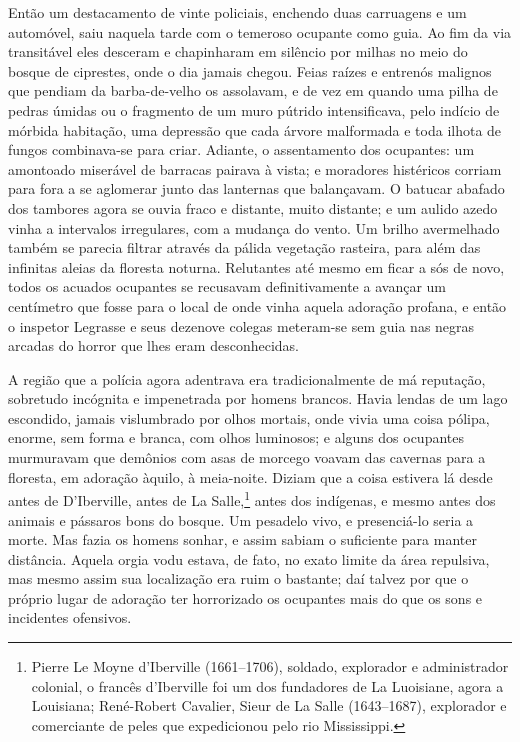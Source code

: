 Então um destacamento de vinte policiais, enchendo duas carruagens e um
automóvel, saiu naquela tarde com o temeroso ocupante como guia. Ao fim
da via transitável eles desceram e chapinharam em silêncio por milhas
no meio do bosque de ciprestes, onde o dia jamais chegou. Feias raízes e
entrenós malignos que pendiam da barba-de-velho os assolavam, e de vez
em quando uma pilha de pedras úmidas ou o fragmento de um muro pútrido
intensificava, pelo indício de mórbida habitação, uma depressão que cada
árvore malformada e toda ilhota de fungos combinava-se para criar.
Adiante, o assentamento dos ocupantes: um amontoado miserável de
barracas pairava à vista; e moradores histéricos corriam para fora a se
aglomerar junto das lanternas que balançavam. O batucar abafado dos
tambores agora se ouvia fraco e distante, muito distante; e um aulido
azedo vinha a intervalos irregulares, com a mudança do vento. Um brilho
avermelhado também se parecia filtrar através da pálida vegetação
rasteira, para além das infinitas aleias da floresta noturna. Relutantes
até mesmo em ficar a sós de novo, todos os acuados ocupantes se
recusavam definitivamente a avançar um centímetro que fosse para o local de onde
vinha aquela adoração profana, e então o inspetor Legrasse e seus
dezenove colegas meteram-se sem guia nas negras arcadas do horror que
lhes eram desconhecidas.

A região que a polícia agora adentrava era tradicionalmente de má
reputação, sobretudo incógnita e impenetrada por homens brancos. Havia
lendas de um lago escondido, jamais vislumbrado por olhos mortais, onde
vivia uma coisa pólipa, enorme, sem forma e branca, com olhos luminosos;
e alguns dos ocupantes murmuravam que demônios com asas de morcego
voavam das cavernas para a floresta, em adoração àquilo, à meia-noite.
Diziam que a coisa estivera lá desde antes de D'Iberville, antes de La
Salle,\footnote{Pierre Le Moyne d'Iberville (1661--1706), soldado,
  explorador e administrador colonial, o francês d'Iberville foi um dos
  fundadores de La Luoisiane, agora a Louisiana; René-Robert Cavalier,
  Sieur de La Salle (1643--1687), explorador e comerciante de peles que
  expedicionou pelo rio Mississippi.} antes dos indígenas, e mesmo antes
dos animais e pássaros bons do bosque. Um pesadelo vivo, e presenciá-lo
seria a morte. Mas fazia os homens sonhar, e assim sabiam o suficiente
para manter distância. Aquela orgia vodu estava, de fato, no exato
limite da área repulsiva, mas mesmo assim sua localização era ruim o
bastante; daí talvez por que o próprio lugar de adoração ter
horrorizado os ocupantes mais do que os sons e incidentes ofensivos.

